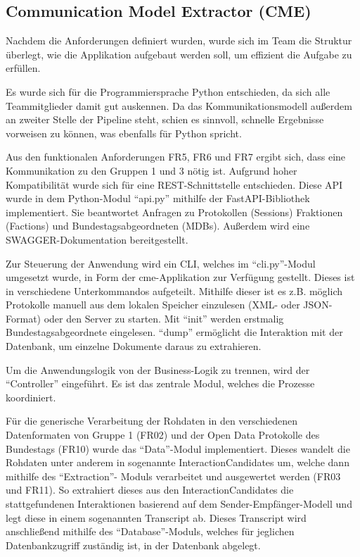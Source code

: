 \subsection{Communication Model Extractor (CME)}
Nachdem die Anforderungen definiert wurden, wurde sich im Team die Struktur
überlegt, wie die Applikation aufgebaut werden soll, um effizient die Aufgabe
zu erfüllen.

Es wurde sich für die Programmiersprache Python entschieden, da sich alle
Teammitglieder damit gut auskennen. Da das Kommunikationsmodell außerdem an
zweiter Stelle der Pipeline steht, schien es sinnvoll, schnelle Ergebnisse
vorweisen zu können, was ebenfalls für Python spricht.

Aus den funktionalen Anforderungen FR5, FR6 und FR7 ergibt sich, dass eine
Kommunikation zu den Gruppen 1 und 3 nötig ist. Aufgrund hoher Kompatibilität
wurde sich für eine REST-Schnittstelle entschieden. Diese API wurde in dem
Python-Modul \enquote{api.py} mithilfe der FastAPI-Bibliothek implementiert. Sie
beantwortet Anfragen zu Protokollen (Sessions) Fraktionen (Factions) und
Bundestagsabgeordneten (MDBs). Außerdem wird eine SWAGGER-Dokumentation
bereitgestellt.

Zur Steuerung der Anwendung wird ein CLI, welches im \enquote{cli.py}-Modul umgesetzt
wurde, in Form der cme-Applikation zur Verfügung gestellt. Dieses ist in
verschiedene Unterkommandos aufgeteilt. Mithilfe dieser ist es z.B. möglich
Protokolle manuell aus dem lokalen Speicher einzulesen (XML- oder JSON-Format)
oder den Server zu starten. Mit \enquote{init} werden erstmalig Bundestagsabgeordnete
eingelesen. \enquote{dump} ermöglicht die Interaktion mit der Datenbank, um einzelne
Dokumente daraus zu extrahieren.

Um die Anwendungslogik von der Business-Logik zu trennen, wird der \enquote{Controller}
eingeführt. Es ist das zentrale Modul, welches die Prozesse koordiniert.

Für die generische Verarbeitung der Rohdaten in den verschiedenen Datenformaten
von Gruppe 1 (FR02) und der Open Data Protokolle des Bundestags (FR10) wurde
das \enquote{Data}-Modul implementiert. Dieses wandelt die Rohdaten unter anderem in
sogenannte InteractionCandidates um, welche dann mithilfe des \enquote{Extraction}-
Moduls verarbeitet und ausgewertet werden (FR03 und FR11). So extrahiert dieses
aus den InteractionCandidates die stattgefundenen Interaktionen basierend auf
dem Sender-Empfänger-Modell und legt diese in einem sogenannten Transcript ab.
Dieses Transcript wird anschließend mithilfe des \enquote{Database}-Moduls, welches für
jeglichen Datenbankzugriff zuständig ist, in der Datenbank abgelegt.

